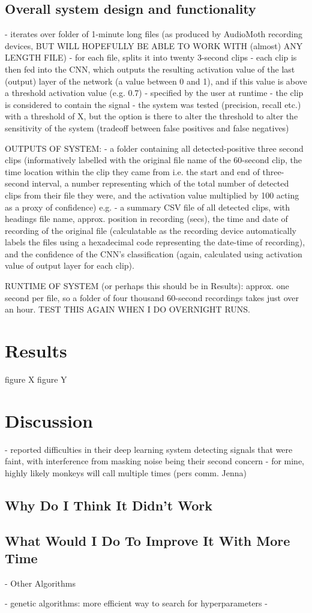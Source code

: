 \documentclass[11pt]{article}
\begin{document}
\subsection{Overall system design and functionality}
- iterates over folder of 1-minute long files (as produced by AudioMoth recording devices, BUT WILL HOPEFULLY BE ABLE TO WORK WITH (almost) ANY LENGTH FILE)
- for each file, splits it into twenty 3-second clips 
- each clip is then fed into the CNN, which outputs the resulting activation value of the last (output) layer of the network (a value between 0 and 1), and if this value is above a threshold activation value (e.g. 0.7) - specified by the user at runtime - the clip is considered to contain the signal 
- the system was tested (precision, recall etc.) with a threshold of X, but the option is there to alter the threshold to alter the sensitivity of the system (tradeoff between false positives and false negatives)

OUTPUTS OF SYSTEM:
- a folder containing all detected-positive three second clips (informatively labelled with the original file name of the 60-second clip, the time location within the clip they came from i.e. the start and end of three-second interval, a number representing which of the total number of detected clips from their file they were, and the activation value multiplied by 100 acting as a proxy of confidence) e.g. 
- a summary CSV file of all detected clips, with headings file name, approx. position in recording (secs), the time and date of recording of the original file (calculatable as the recording device automatically labels the files using a hexadecimal code representing the date-time of recording), and the confidence of the CNN's classification (again, calculated using activation value of output layer for each clip). 

RUNTIME OF SYSTEM (or perhaps this should be in Results): approx. one second per file, so a folder of four thousand 60-second recordings takes just over an hour. TEST THIS AGAIN WHEN I DO OVERNIGHT RUNS.

\section{Results}
figure X
figure Y

\section{Discussion}

- \citep{stowell2018automatic} reported difficulties in their deep learning system detecting signals that were faint, with interference from masking noise being their second concern
- for mine, highly likely monkeys will call multiple times (pers comm. Jenna) 



\subsection{Why Do I Think It Didn't Work}
\subsection{What Would I Do To Improve It With More Time}
- Other Algorithms

- genetic algorithms: more efficient way to search for hyperparameters 
- 
\end{document}
